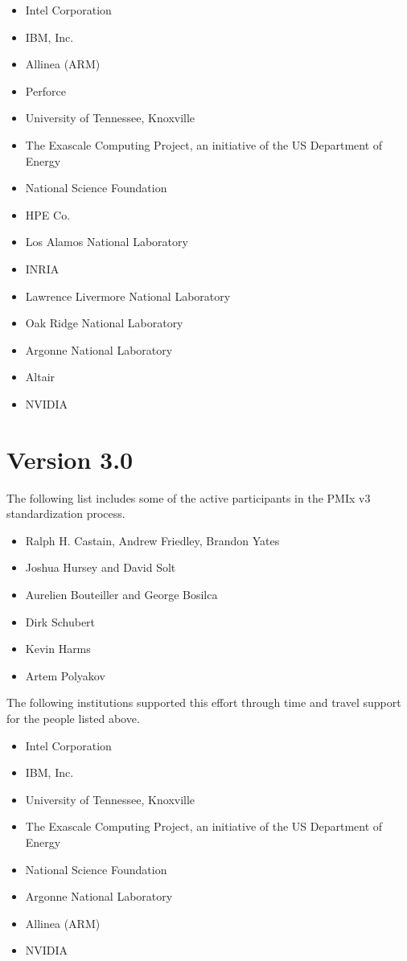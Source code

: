 \begin{itemize}
\item Intel Corporation
\item IBM, Inc.
\item Allinea (ARM)
\item Perforce
\item University of Tennessee, Knoxville
\item The Exascale Computing Project, an initiative of the US Department of Energy
\item National Science Foundation
\item HPE Co.
\item Los Alamos National Laboratory
\item INRIA
\item Lawrence Livermore National Laboratory
\item Oak Ridge National Laboratory
\item Argonne National Laboratory
\item Altair
\item NVIDIA
\end{itemize}

\section{Version 3.0}

The following list includes some of the active participants in the PMIx v3 standardization process.

\begin{itemize}
\item Ralph H. Castain, Andrew Friedley, Brandon Yates
\item Joshua Hursey and David Solt
\item Aurelien Bouteiller and George Bosilca
\item Dirk Schubert
\item Kevin Harms
\item Artem Polyakov
\end{itemize}

The following institutions supported this effort through time and travel support for the people listed above.

\begin{itemize}
\item Intel Corporation
\item IBM, Inc.
\item University of Tennessee, Knoxville
\item The Exascale Computing Project, an initiative of the US Department of Energy
\item National Science Foundation
\item Argonne National Laboratory
\item Allinea (ARM)
\item NVIDIA
\end{itemize}

